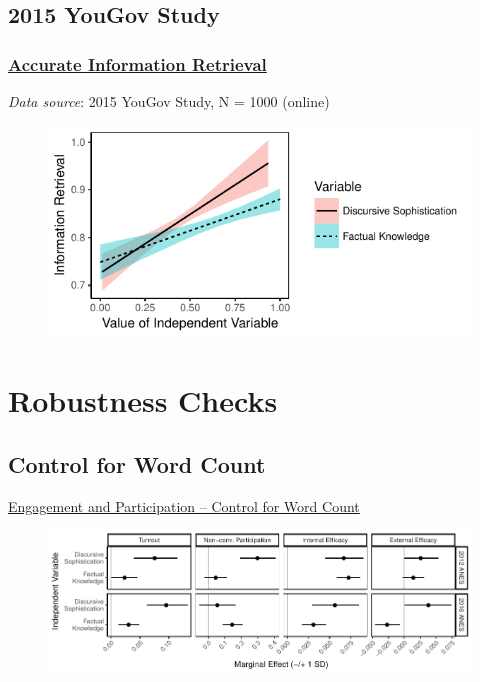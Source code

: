 \subsection{2015 YouGov Study}

\begin{frame} %
\frametitle{\hyperlink{retrieval_joint}{Accurate Information Retrieval}}\label{retrieval}
\emph{Data source}: 2015 YouGov Study, N = 1000 (online)
\begin{figure}
\includegraphics{../fig/yg_disease.pdf}
\end{figure}
\end{frame}


\section{Robustness Checks}


\subsection{Control for Word Count}
\begin{frame}{\hyperlink{engagement}{Engagement and Participation -- Control for Word Count}}\label{engagement_lwc}
  \begin{figure}
  \includegraphics[width=\textwidth]{../fig/knoweff_lwc.pdf}
  \end{figure}
\end{frame}


